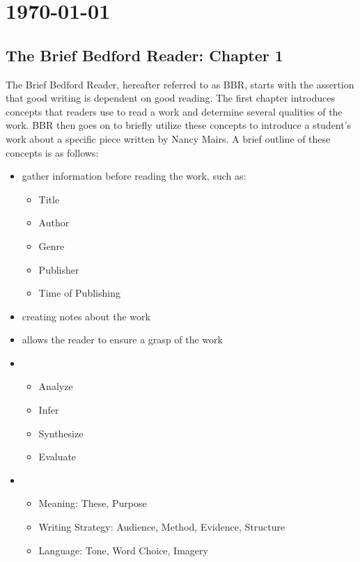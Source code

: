 \documentclass[journal.tex]{subfiles}
\begin{document}
\pagebreak
\section*{\today}

\subsection*{The Brief Bedford Reader: Chapter 1}

The Brief Bedford Reader, hereafter referred to as BBR, starts with the assertion that good writing is dependent on good reading.
The first chapter introduces concepts that readers use to read a work and determine several qualities of the work.
BBR then goes on to briefly utilize these concepts to introduce a student's work about a specific piece written by Nancy Mairs.
A brief outline of these concepts is as follows:

\begin{itemize}
    \item {} gather information before reading the work, such as:
    \begin{itemize}
        \item Title
        \item Author
        \item Genre
        \item Publisher
        \item Time of Publishing
    \end{itemize}

    \item {} creating notes about the work
    \item {} allows the reader to ensure a grasp of the work
    
    \item {}
    \begin{itemize}
        \item Analyze
        \item Infer
        \item Synthesize
        \item Evaluate
    \end{itemize}
    
    \item {}
    \begin{itemize}
        \item Meaning: These, Purpose
        \item Writing Strategy: Audience, Method, Evidence, Structure
        \item Language: Tone, Word Choice, Imagery
    \end{itemize}
\end{itemize}
\end{document}
